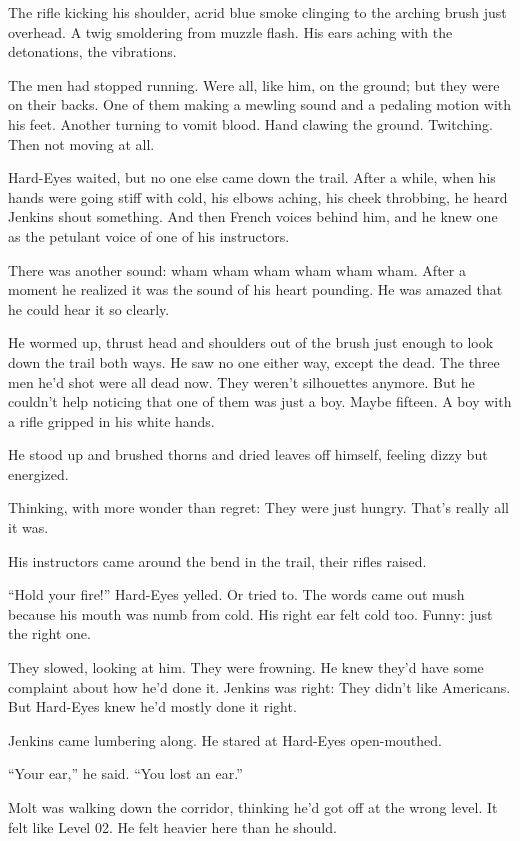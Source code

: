 The rifle kicking his shoulder, acrid blue smoke clinging to the arching brush just overhead. A twig smoldering from muzzle flash. His ears aching with the detonations, the vibrations.

The men had stopped running. Were all, like him, on the ground; but they were on their backs. One of them making a mewling sound and a pedaling motion with his feet. Another turning to vomit blood. Hand clawing the ground. Twitching. Then not moving at all.

Hard-Eyes waited, but no one else came down the trail. After a while, when his hands were going stiff with cold, his elbows aching, his cheek throbbing, he heard Jenkins shout something. And then French voices behind him, and he knew one as the petulant voice of one of his instructors.

There was another sound: wham wham wham wham wham wham. After a moment he realized it was the sound of his heart pounding. He was amazed that he could hear it so clearly.

He wormed up, thrust head and shoulders out of the brush just enough to look down the trail both ways. He saw no one either way, except the dead. The three men he'd shot were all dead now. They weren't silhouettes anymore. But he couldn't help noticing that one of them was just a boy. Maybe fifteen. A boy with a rifle gripped in his white hands.

He stood up and brushed thorns and dried leaves off himself, feeling dizzy but energized.

Thinking, with more wonder than regret: They were just hungry. That's really all it was.

His instructors came around the bend in the trail, their rifles raised.

``Hold your fire!'' Hard-Eyes yelled. Or tried to. The words came out mush because his mouth was numb from cold. His right ear felt cold too. Funny: just the right one.

They slowed, looking at him. They were frowning. He knew they'd have some complaint about how he'd done it. Jenkins was right: They didn't like Americans. But Hard-Eyes knew he'd mostly done it right.

Jenkins came lumbering along. He stared at Hard-Eyes open-mouthed.

``Your ear,'' he said. ``You lost an ear.''

Molt was walking down the corridor, thinking he'd got off at the wrong level. It felt like Level 02. He felt heavier here than he should.

